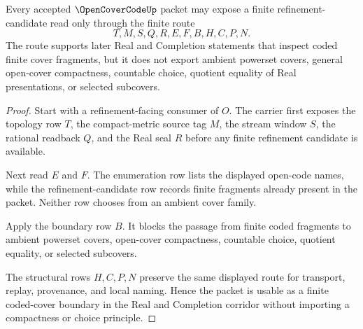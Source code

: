 \begin{theorem}
\label{thm:open-cover-code-finite-refinement-boundary}
Every accepted $\OpenCoverCodeUp$ packet may expose a finite refinement-candidate read only through the finite route
$$
T,M,S,Q,R,E,F,B,H,C,P,N .
$$
The route supports later Real and Completion statements that inspect coded finite cover fragments, but it does not export ambient powerset covers, general open-cover compactness, countable choice, quotient equality of Real presentations, or selected subcovers.
\end{theorem}
\begin{proof}
Start with a refinement-facing consumer of $O$. The carrier first exposes the topology row $T$, the compact-metric source tag $M$, the stream window $S$, the rational readback $Q$, and the Real seal $R$ before any finite refinement candidate is available.

Next read $E$ and $F$. The enumeration row lists the displayed open-code names, while the refinement-candidate row records finite fragments already present in the packet. Neither row chooses from an ambient cover family.

Apply the boundary row $B$. It blocks the passage from finite coded fragments to ambient powerset covers, open-cover compactness, countable choice, quotient equality, or selected subcovers.

The structural rows $H,C,P,N$ preserve the same displayed route for transport, replay, provenance, and local naming. Hence the packet is usable as a finite coded-cover boundary in the Real and Completion corridor without importing a compactness or choice principle.
\end{proof}

\begin{closurestatus}{\OpenCoverCodeUp}
  \theoryclosure{\seedClosure}
  \formalstatus{\unformalizedV}
\end{closurestatus}
